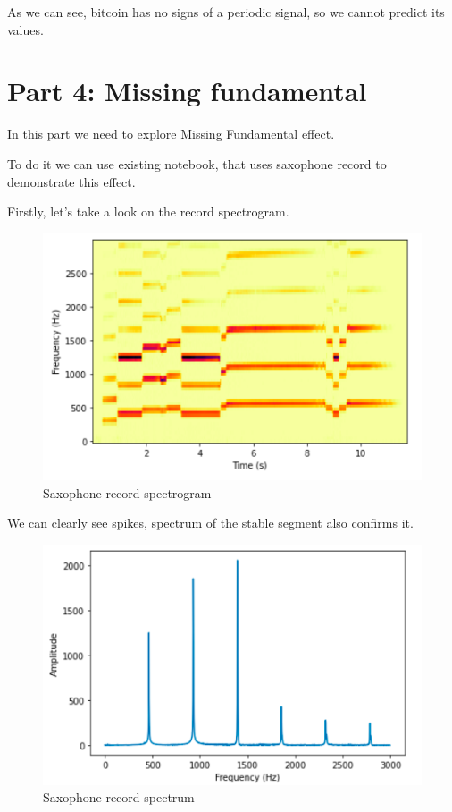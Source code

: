 \documentclass[a4paper]{article}
\begin{document}
        As we can see, bitcoin has no signs of a periodic signal, so we cannot predict its values.
            
    \newpage
        \section{Part 4: Missing fundamental}
        
            In this part we need to explore Missing Fundamental effect.
            
            To do it we can use existing notebook, that uses saxophone record to demonstrate this effect.
            
            Firstly, let's take a look on the record spectrogram.
            
            \begin{figure}[H]
                \centering
                \includegraphics[width=\textwidth]{img/sac_spectr.png}
                \caption{Saxophone record spectrogram}
                \label{fig:part42}
            \end{figure}
            
            We can clearly see spikes, spectrum of the stable segment also confirms it.
            
            \begin{figure}[H]
                \centering
                \includegraphics[width=\textwidth]{img/sac_spec.png}
                \caption{Saxophone record spectrum}
                \label{fig:part42}
            \end{figure}
            
\end{document}
